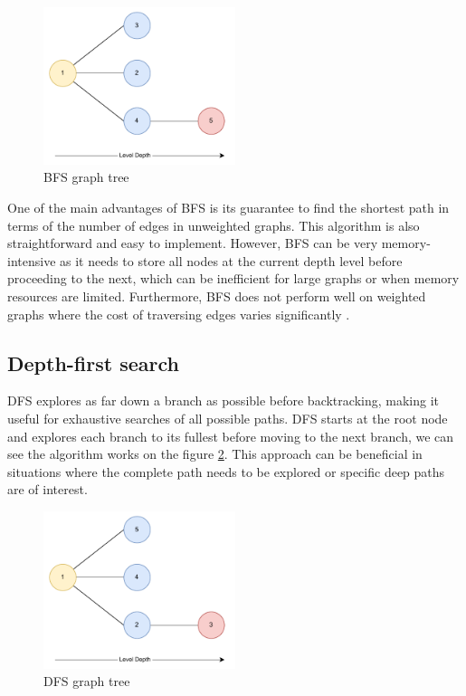 \documentclass[12pt]{report}
\begin{document}
        \begin{figure}[H]
            \centering
            \includegraphics[width=0.5\textwidth]{General Image/OSM Drone-BFS.pdf}
            \caption{BFS graph tree}
            \label{fig:bfs}
        \end{figure}

        One of the main advantages of BFS is its guarantee to find the shortest path in terms of the number of edges in
        unweighted graphs. This algorithm is also straightforward and easy to implement. However, BFS can be very
        memory-intensive as it needs to store all nodes at the current depth level before proceeding to the next, which
        can be inefficient for large graphs or when memory resources are limited. Furthermore, BFS does not perform well
        on weighted graphs where the cost of traversing edges varies significantly \cite{cormen_introduction_2022}.

        \subsection{Depth-first search} 
        \ac{DFS} explores as far down a branch as possible before backtracking, making it useful for exhaustive searches
        of all possible paths. DFS starts at the root node and explores each branch to its fullest before moving to the
        next branch, we can see the algorithm works on the figure \ref{fig:dfs}. This approach can be beneficial in
        situations where the complete path needs to be explored or specific deep paths are of interest.

        \begin{figure}[H]
            \centering
            \includegraphics[width=0.5\textwidth]{General Image/OSM Drone-DFS.pdf}
            \caption{DFS graph tree}
            \label{fig:dfs}
        \end{figure}
\end{document}
